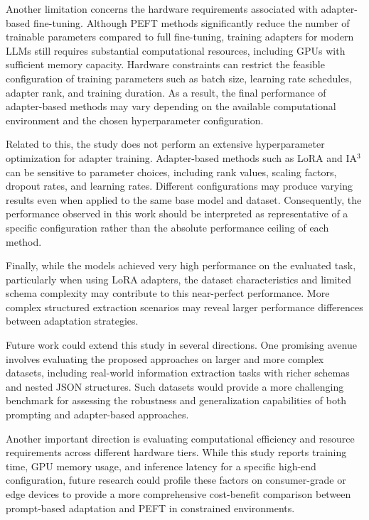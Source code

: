 \documentclass[journal,article,submit,pdftex,moreauthors]{Definitions/mdpi}
\begin{document}
Another limitation concerns the hardware requirements associated with adapter-based fine-tuning. Although PEFT methods significantly reduce the number of trainable parameters compared to full fine-tuning, training adapters for modern LLMs still requires substantial computational resources, including GPUs with sufficient memory capacity. Hardware constraints can restrict the feasible configuration of training parameters such as batch size, learning rate schedules, adapter rank, and training duration. As a result, the final performance of adapter-based methods may vary depending on the available computational environment and the chosen hyperparameter configuration.

Related to this, the study does not perform an extensive hyperparameter optimization for adapter training. Adapter-based methods such as LoRA and IA$^3$ can be sensitive to parameter choices, including rank values, scaling factors, dropout rates, and learning rates. Different configurations may produce varying results even when applied to the same base model and dataset. Consequently, the performance observed in this work should be interpreted as representative of a specific configuration rather than the absolute performance ceiling of each method.

Finally, while the models achieved very high performance on the evaluated task, particularly when using LoRA adapters, the dataset characteristics and limited schema complexity may contribute to this near-perfect performance. More complex structured extraction scenarios may reveal larger performance differences between adaptation strategies.

Future work could extend this study in several directions. One promising avenue involves evaluating the proposed approaches on larger and more complex datasets, including real-world information extraction tasks with richer schemas and nested JSON structures. Such datasets would provide a more challenging benchmark for assessing the robustness and generalization capabilities of both prompting and adapter-based approaches.

Another important direction is evaluating computational efficiency and resource requirements across different hardware tiers. While this study reports training time, GPU memory usage, and inference latency for a specific high-end configuration, future research could profile these factors on consumer-grade or edge devices to provide a more comprehensive cost-benefit comparison between prompt-based adaptation and PEFT in constrained environments.
\end{document}
